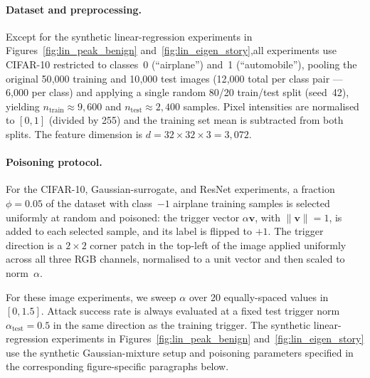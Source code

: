 \documentclass[11pt]{article}
\newcommand{\bv}{\mathbf{v}}
\begin{document}
\paragraph{Dataset and preprocessing.}
Except for the synthetic linear-regression experiments in
Figures~\ref{fig:lin_peak_benign} and~\ref{fig:lin_eigen_story},all experiments use CIFAR-10 restricted to classes~0 (``airplane'') and~1 (``automobile''), pooling the original 50{,}000 training and 10{,}000 test images (12{,}000 total per class pair --- 6{,}000 per class) and applying a single random 80/20 train/test split (seed~42), yielding $n_{\mathrm{train}}\approx 9{,}600$ and $n_{\mathrm{test}}\approx 2{,}400$ samples. Pixel intensities are normalised to $[0,1]$ (divided by 255) and the training set mean is subtracted from both splits. The feature dimension is $d = 32 \times 32 \times 3 = 3{,}072$.



\paragraph{Poisoning protocol.}
For the CIFAR-10, Gaussian-surrogate, and ResNet experiments, a fraction
\(\phi=0.05\) of the dataset with class~\(-1\) airplane training samples is selected
uniformly at random and poisoned: the trigger vector \(\alpha\bv\), with
\(\|\bv\|=1\), is added to each selected sample, and its label is flipped to
\(+1\). The trigger direction is a \(2{\times}2\) corner patch in the top-left
of the image applied uniformly across all three RGB channels, normalised to a
unit vector and then scaled to norm~\(\alpha\).

For these image experiments, we sweep \(\alpha\) over 20 equally-spaced values
in \([0,1.5]\). Attack success rate is always evaluated at a fixed test trigger
norm \(\alpha_{\mathrm{test}}=0.5\) in the same direction as the training
trigger. The synthetic linear-regression experiments in
Figures~\ref{fig:lin_peak_benign} and~\ref{fig:lin_eigen_story} use the
synthetic Gaussian-mixture setup and poisoning parameters specified in the
corresponding figure-specific paragraphs below.
\end{document}
